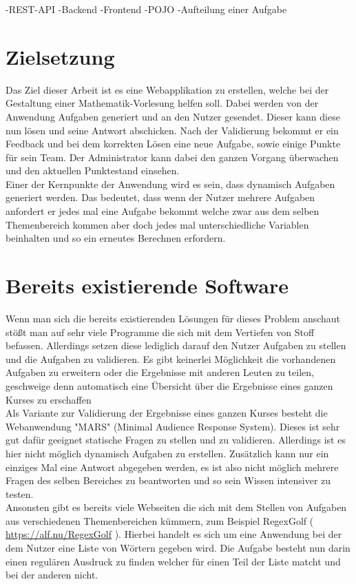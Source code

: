-REST-API
-Backend
-Frontend
-POJO
-Aufteilung einer Aufgabe

\section{Zielsetzung}

Das Ziel dieser Arbeit ist es eine Webapplikation zu erstellen, welche bei der Gestaltung einer Mathematik-Vorlesung helfen soll. Dabei werden von der Anwendung Aufgaben generiert und an den Nutzer gesendet. Dieser kann diese nun lösen und seine Antwort abschicken. Nach der Validierung bekommt er ein Feedback und bei dem korrekten Lösen eine neue Aufgabe, sowie einige Punkte für sein Team. Der Administrator kann dabei den ganzen Vorgang überwachen und den aktuellen Punktestand einsehen. \\
Einer der Kernpunkte der Anwendung wird es sein, dass dynamisch Aufgaben generiert werden. Das bedeutet, dass wenn der Nutzer mehrere Aufgaben anfordert er jedes mal eine Aufgabe bekommt welche zwar aus dem selben Themenbereich kommen aber doch jedes mal unterschiedliche Variablen beinhalten und so ein erneutes Berechnen erfordern.


\section{Bereits existierende Software}

Wenn man sich die bereits existierenden Lösungen für dieses Problem anschaut stößt man auf sehr viele Programme die sich mit dem Vertiefen von Stoff befassen. Allerdings setzen diese lediglich darauf den Nutzer Aufgaben zu stellen und die Aufgaben zu validieren. Es gibt keinerlei Möglichkeit die vorhandenen Aufgaben zu erweitern oder die Ergebnisse mit anderen Leuten zu teilen, geschweige denn automatisch eine Übersicht über die Ergebnisse eines ganzen Kurses zu erschaffen \\

Als Variante zur Validierung der Ergebnisse eines ganzen Kurses besteht die Webanwendung "MARS" (Minimal Audience Response System). Dieses ist sehr gut dafür geeignet statische Fragen zu stellen und zu validieren. Allerdings ist es hier nicht möglich dynamisch Aufgaben zu erstellen. Zusätzlich kann nur ein einziges Mal eine Antwort abgegeben werden, es ist also nicht möglich mehrere Fragen des selben Bereiches zu beantworten und so sein Wissen intensiver zu testen. \\

Ansonsten gibt es bereits viele Webseiten die sich mit dem Stellen von Aufgaben aus verschiedenen Themenbereichen kümmern, zum Beispiel RegexGolf ( \url{https://alf.nu/RegexGolf} ). Hierbei handelt es sich um eine Anwendung bei der dem Nutzer eine Liste von Wörtern gegeben wird. Die Aufgabe besteht nun darin einen regulären Ausdruck zu finden welcher für einen Teil der Liste matcht und bei der anderen nicht.

